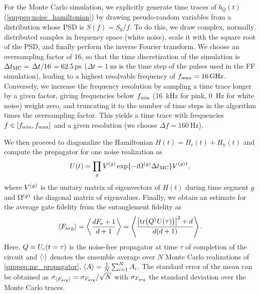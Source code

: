 For the Monte Carlo simulation, we explicitly generate time traces of $b_Q(t)$ (\cf \cref{suppeq:noise_hamiltonian}) by drawing pseudo-random variables from a distribution whose PSD is $S(f) = S_0/f$. To do this, we draw complex, normally distributed samples in frequency space (\ie white noise), scale it with the square root of the PSD, and finally perform the inverse Fourier transform. We choose an oversampling factor of 16, so that the time discretization of the simulation is $\Delta t_\mr{MC} = \flatfrac{\Delta t}{16} = \SI{62.5}{\pico\second}$ ($\Delta t = \SI{1}{\nano\second}$ is the time step of the pulses used in the FF simulation), leading to a highest resolvable frequency of $f_{\mathrm{max}} = \SI{16}{\giga\hertz}$. Conversely, we increase the frequency resolution by sampling a time trace longer by a given factor, giving frequencies below $f_{\mathrm{min}}$ (\SI{16}{\kilo\hertz} for pink, \SI{0}{\hertz} for white noise) weight zero, and truncating it to the number of time steps in the algorithm times the oversampling factor. This yields a time trace with frequencies $f\in [f_{\mathrm{min}}, f_{\mathrm{max}}]$ and a given resolution (we choose $\Delta f = \SI{160}{\hertz}$). 

We then proceed to diagonalize the Hamiltonian $H(t) = H_c(t) + H_n(t)$ and compute the propagator for one noise realization as
\begin{equation}\label{suppeq:mc_propagator}
    U(t) = \prod_g V^{(g)}\exp\lbrace -\mathrm{i}\Omega^{(g)}\Delta t_{\mathrm{MC}}\rbrace V^{(g)\dagger},
\end{equation}
where $V^{(g)}$ is the unitary matrix of eigenvectors of $H(t)$ during time segment $g$ and $\Omega^{(g)}$ the diagonal matrix of eigenvalues. Finally, we obtain an estimate for the average gate fidelity \avgfid from the entanglement fidelity \entfid as
\begin{equation}
    \ev{\avgfid} = \ev{\frac{d\entfid + 1}{d+1}} = \ev{\frac{\abs{\tr(Q\adjoint U(\tau))}^2 + d}{d(d+1)}}.
\end{equation}
Here, $Q\equiv U_{\mathrm{c}}(t=\tau)$ is the noise-free propagator at time $\tau$ of completion of the circuit and $\ev{\cdot}$ denotes the ensemble average over $N$ Monte Carlo realizations of \cref{suppeq:mc_propagator}, \ie $\ev{A}=\frac{1}{N}\sum_{i=1}^N A_i$. The standard error of the mean can be obtained as $\sigma_{\ev{\avgfid}} = \sigma_{\avgfid} / \sqrt{N}$ with $\sigma_{F_{\mathrm{avg}}}$ the standard deviation over the Monte Carlo traces.

